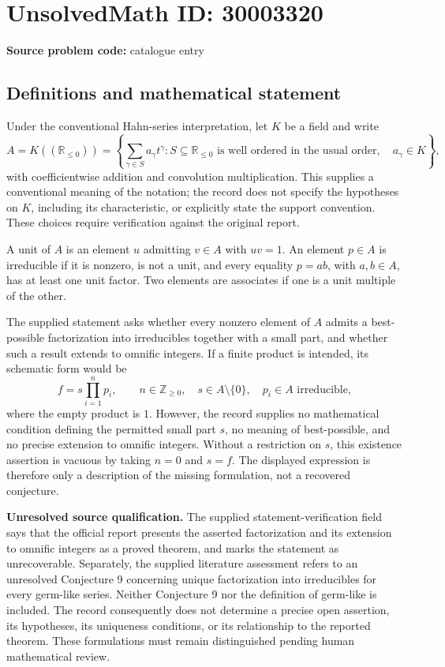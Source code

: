 \documentclass[11pt]{article}
\newcommand{\Z}{\mathbb{Z}}
\newcommand{\R}{\mathbb{R}}
\begin{document}
\section*{UnsolvedMath ID: 30003320}
\textbf{Source problem code:} catalogue entry
\subsection{Definitions and mathematical statement}
Under the conventional Hahn-series interpretation, let \(K\) be a field and write
\[
A=K((\R_{\leq 0}))
 =\left\{\sum_{\gamma\in S}a_\gamma t^\gamma:
 S\subseteq\R_{\leq 0}\text{ is well ordered in the usual order},\quad a_\gamma\in K\right\},
\]
with coefficientwise addition and convolution multiplication. This supplies a conventional meaning of the notation; the record does not specify the hypotheses on \(K\), including its characteristic, or explicitly state the support convention. These choices require verification against the original report.

A unit of \(A\) is an element \(u\) admitting \(v\in A\) with \(uv=1\). An element \(p\in A\) is irreducible if it is nonzero, is not a unit, and every equality \(p=ab\), with \(a,b\in A\), has at least one unit factor. Two elements are associates if one is a unit multiple of the other.

The supplied statement asks whether every nonzero element of \(A\) admits a best-possible factorization into irreducibles together with a small part, and whether such a result extends to omnific integers. If a finite product is intended, its schematic form would be
\[
f=s\prod_{i=1}^{n}p_i,
\qquad n\in\Z_{\geq 0},\quad s\in A\setminus\{0\},
\quad p_i\in A\text{ irreducible},
\]
where the empty product is \(1\). However, the record supplies no mathematical condition defining the permitted small part \(s\), no meaning of best-possible, and no precise extension to omnific integers. Without a restriction on \(s\), this existence assertion is vacuous by taking \(n=0\) and \(s=f\). The displayed expression is therefore only a description of the missing formulation, not a recovered conjecture.

\textbf{Unresolved source qualification.} The supplied statement-verification field says that the official report presents the asserted factorization and its extension to omnific integers as a proved theorem, and marks the statement as unrecoverable. Separately, the supplied literature assessment refers to an unresolved Conjecture 9 concerning unique factorization into irreducibles for every germ-like series. Neither Conjecture 9 nor the definition of germ-like is included. The record consequently does not determine a precise open assertion, its hypotheses, its uniqueness conditions, or its relationship to the reported theorem. These formulations must remain distinguished pending human mathematical review.
\end{document}
